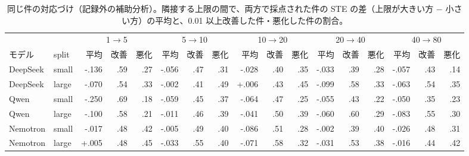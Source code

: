 \documentclass{article}
\providecommand{\unverified}[1]{#1}
\begin{document}
\begin{table}[t]
\centering
\caption{同じ件の対応づけ（記録外の補助分析）。隣接する上限の間で、両方で採点された件の STE の差（上限が大きい方 $-$ 小さい方）の平均と、0.01 以上改善した件・悪化した件の割合。}
\label{tab:paired}
{\tiny\setlength{\tabcolsep}{2.5pt}
\begin{tabular}{llrrrrrrrrrrrrrrr}
\hline
 & & \multicolumn{3}{c}{1$\to$5} & \multicolumn{3}{c}{5$\to$10} & \multicolumn{3}{c}{10$\to$20} & \multicolumn{3}{c}{20$\to$40} & \multicolumn{3}{c}{40$\to$80} \\
モデル & split & 平均 & 改善 & 悪化 & 平均 & 改善 & 悪化 & 平均 & 改善 & 悪化 & 平均 & 改善 & 悪化 & 平均 & 改善 & 悪化 \\
\hline
DeepSeek & small & \unverified{-.136} & \unverified{.59} & \unverified{.27} & \unverified{-.056} & \unverified{.47} & \unverified{.31} & \unverified{-.028} & \unverified{.40} & \unverified{.35} & \unverified{-.033} & \unverified{.39} & \unverified{.28} & \unverified{-.057} & \unverified{.43} & \unverified{.14} \\
DeepSeek & large & \unverified{-.070} & \unverified{.54} & \unverified{.33} & \unverified{-.002} & \unverified{.41} & \unverified{.49} & \unverified{+.006} & \unverified{.43} & \unverified{.45} & \unverified{-.099} & \unverified{.58} & \unverified{.33} & \unverified{-.063} & \unverified{.54} & \unverified{.35} \\
Qwen & small & \unverified{-.250} & \unverified{.69} & \unverified{.18} & \unverified{-.059} & \unverified{.45} & \unverified{.37} & \unverified{-.064} & \unverified{.47} & \unverified{.25} & \unverified{-.055} & \unverified{.43} & \unverified{.22} & \unverified{-.050} & \unverified{.35} & \unverified{.23} \\
Qwen & large & \unverified{-.100} & \unverified{.58} & \unverified{.21} & \unverified{-.011} & \unverified{.46} & \unverified{.39} & \unverified{-.041} & \unverified{.50} & \unverified{.39} & \unverified{-.060} & \unverified{.60} & \unverified{.29} & \unverified{-.083} & \unverified{.55} & \unverified{.30} \\
Nemotron & small & \unverified{-.017} & \unverified{.48} & \unverified{.42} & \unverified{-.005} & \unverified{.49} & \unverified{.40} & \unverified{-.086} & \unverified{.51} & \unverified{.28} & \unverified{-.002} & \unverified{.39} & \unverified{.40} & \unverified{-.026} & \unverified{.48} & \unverified{.31} \\
Nemotron & large & \unverified{+.005} & \unverified{.48} & \unverified{.45} & \unverified{-.033} & \unverified{.55} & \unverified{.40} & \unverified{-.071} & \unverified{.58} & \unverified{.32} & \unverified{-.031} & \unverified{.53} & \unverified{.38} & \unverified{-.016} & \unverified{.44} & \unverified{.42} \\
\hline
\end{tabular}}
\end{table}
\end{document}
